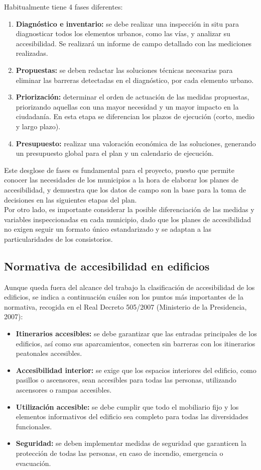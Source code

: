 Habitualmente tiene 4 fases diferentes:
\begin{enumerate}
    \item \textbf{Diagnóstico e inventario:} se debe realizar una inspección in situ para diagnosticar todos los elementos urbanos, como las vías, y analizar su accesibilidad. Se realizará un informe de campo detallado con las mediciones realizadas.
    \item \textbf{Propuestas:} se deben redactar las soluciones técnicas necesarias para eliminar las barreras detectadas en el diagnóstico, por cada elemento urbano.
    \item \textbf{Priorización:} determinar el orden de actuación de las medidas propuestas, priorizando aquellas con una mayor necesidad y un mayor impacto en la ciudadanía. En esta etapa se diferencian los plazos de ejecución (corto, medio y largo plazo).
    \item \textbf{Presupuesto:} realizar una valoración económica de las soluciones, generando un presupuesto global para el plan y un calendario de ejecución.
\end{enumerate}

Este desglose de fases es fundamental para el proyecto, puesto que permite conocer las necesidades de los municipios a la hora de elaborar los planes de accesibilidad, y demuestra que los datos de campo son la base para la toma de decisiones en las siguientes etapas del plan.
\\

Por otro lado, es importante considerar la posible diferenciación de las medidas y variables inspeccionadas en cada municipio, dado que los planes de accesibilidad no exigen seguir un formato único estandarizado y se adaptan a las particularidades de los consistorios.
\\

\subsection{Normativa de accesibilidad en edificios}
Aunque queda fuera del alcance del trabajo la clasificación de accesibilidad de los edificios, se indica a continuación cuáles son los puntos más importantes de la normativa, recogida en el Real Decreto 505/2007 (Ministerio de la Presidencia, 2007):
\begin{itemize}
    \item \textbf{Itinerarios accesibles:} se debe garantizar que las entradas principales de los edificios, así como sus aparcamientos, conecten sin barreras con los itinerarios peatonales accesibles.
    \item \textbf{Accesibilidad interior:} se exige que los espacios interiores del edificio, como pasillos o ascensores, sean accesibles para todas las personas, utilizando ascensores o rampas accesibles.
    \item \textbf{Utilización accesible:} se debe cumplir que todo el mobiliario fijo y los elementos informativos del edificio sea completo para todas las diversidades funcionales.
    \item \textbf{Seguridad:} se deben implementar medidas de seguridad que garanticen la protección de todas las personas, en caso de incendio, emergencia o evacuación.
\end{itemize}
